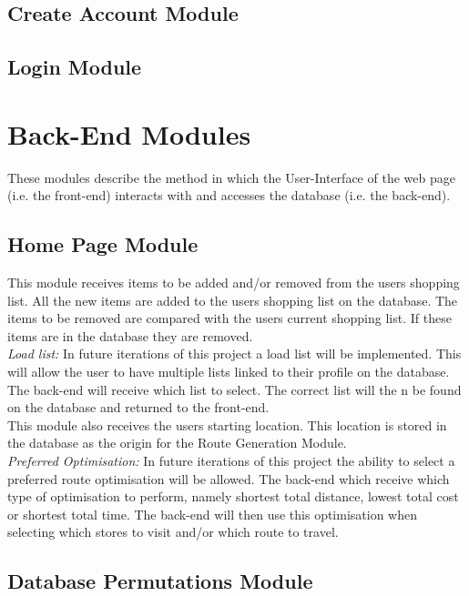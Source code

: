 \documentclass[10pt, a4paper, onecolumn]{scrartcl}
\begin{document}
		
		\subsection{Create Account Module}
		
		\subsection{Login Module}
	
	\section{Back-End Modules}
		
		These modules describe the method in which the User-Interface of the web page (i.e. the front-end) interacts with and accesses the database (i.e. the back-end).
		
		\subsection{Home Page Module}
			
			This module receives items to be added and/or removed from the users shopping list. All the new items are added to the users shopping list on the database. The items to be removed are compared with the users current shopping list. If these items are in the database they are removed.\\
			
			\textit{Load list:} In future iterations of this project a load list will be implemented. This will allow the user to have multiple lists linked to their profile on the database. The back-end will receive which list to select. The correct list will the n be found on the database and returned to the front-end. \\
			
			This module also receives the users starting location. This location is stored in the database as the origin for the Route Generation Module.\\
			
			\textit{Preferred Optimisation:} In future iterations of this project the ability to select a preferred route optimisation will be allowed. The back-end which receive which type of optimisation to perform, namely shortest total distance, lowest total cost or shortest total time. The back-end will then use this optimisation when selecting which stores to visit and/or which route to travel.
			
		\subsection{Database Permutations Module}
			
\end{document}
